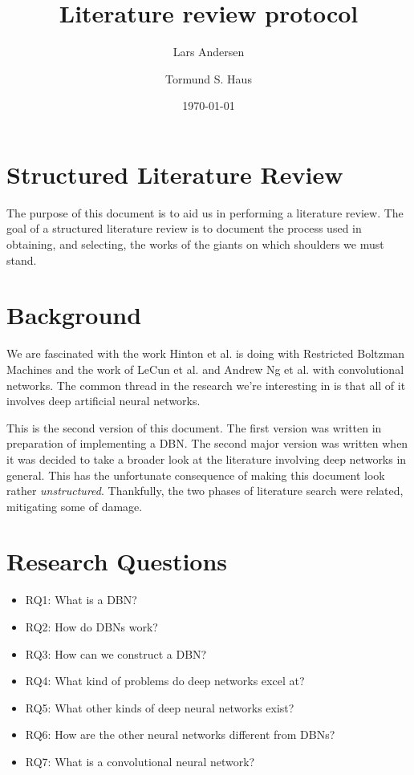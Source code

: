 \documentclass[11pt]{article}
\title{Literature review protocol}
\author{Lars Andersen \and Tormund S. Haus}
\date{\today}
\begin{document}
\maketitle
\newpage

\section{Structured Literature Review}

The purpose of this document is to aid us in performing a literature review.  The goal of a structured literature review is to document the process used in obtaining, and selecting, the works of the giants on which shoulders we must stand.

\section{Background}

We are fascinated with the work Hinton et al. is doing with Restricted Boltzman Machines and the work of LeCun et al. and Andrew Ng et al. with convolutional networks.  The common thread in the research we're interesting in is that all of it involves deep artificial neural networks.

This is the second version of this document.  The first version was written in preparation of implementing a DBN.  The second major version was written when it was decided to take a broader look at the literature involving deep networks in general.  This has the unfortunate consequence of making this document look rather \textit{unstructured}.  Thankfully, the two phases of literature search were related, mitigating some of damage.

\section{Research Questions}

\begin{itemize}
 \item RQ1: What is a DBN?
 \item RQ2: How do DBNs work?
 \item RQ3: How can we construct a DBN?
 \item RQ4: What kind of problems do deep networks excel at?
 \item RQ5: What other kinds of deep neural networks exist?
 \item RQ6: How are the other neural networks different from DBNs?
 \item RQ7: What is a convolutional neural network?
\end{itemize}
\end{document}
